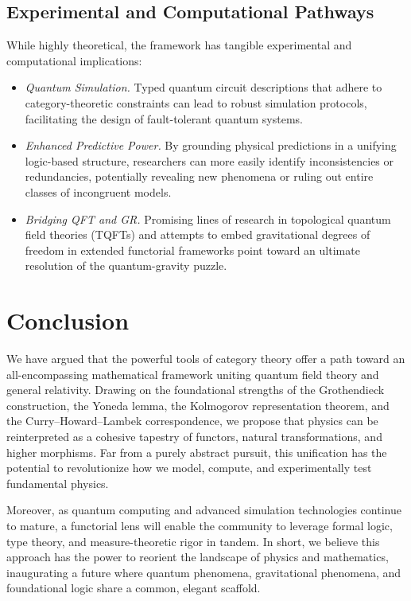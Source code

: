 \documentclass[12pt]{article}
\begin{document}
\subsection{Experimental and Computational Pathways}
While highly theoretical, the framework has tangible experimental and computational implications:
\begin{itemize}
\item \textit{Quantum Simulation.} Typed quantum circuit descriptions that adhere to category-theoretic constraints can lead to robust simulation protocols, facilitating the design of fault-tolerant quantum systems.
\item \textit{Enhanced Predictive Power.} By grounding physical predictions in a unifying logic-based structure, researchers can more easily identify inconsistencies or redundancies, potentially revealing new phenomena or ruling out entire classes of incongruent models.
\item \textit{Bridging QFT and GR.} Promising lines of research in topological quantum field theories (TQFTs) and attempts to embed gravitational degrees of freedom in extended functorial frameworks point toward an ultimate resolution of the quantum-gravity puzzle.
\end{itemize}

\section{Conclusion}
We have argued that the powerful tools of category theory offer a path toward an all-encompassing mathematical framework uniting quantum field theory and general relativity. Drawing on the foundational strengths of the Grothendieck construction, the Yoneda lemma, the Kolmogorov representation theorem, and the Curry--Howard--Lambek correspondence, we propose that physics can be reinterpreted as a cohesive tapestry of functors, natural transformations, and higher morphisms. Far from a purely abstract pursuit, this unification has the potential to revolutionize how we model, compute, and experimentally test fundamental physics.

Moreover, as quantum computing and advanced simulation technologies continue to mature, a functorial lens will enable the community to leverage formal logic, type theory, and measure-theoretic rigor in tandem. In short, we believe this approach has the power to reorient the landscape of physics and mathematics, inaugurating a future where quantum phenomena, gravitational phenomena, and foundational logic share a common, elegant scaffold.
\end{document}
